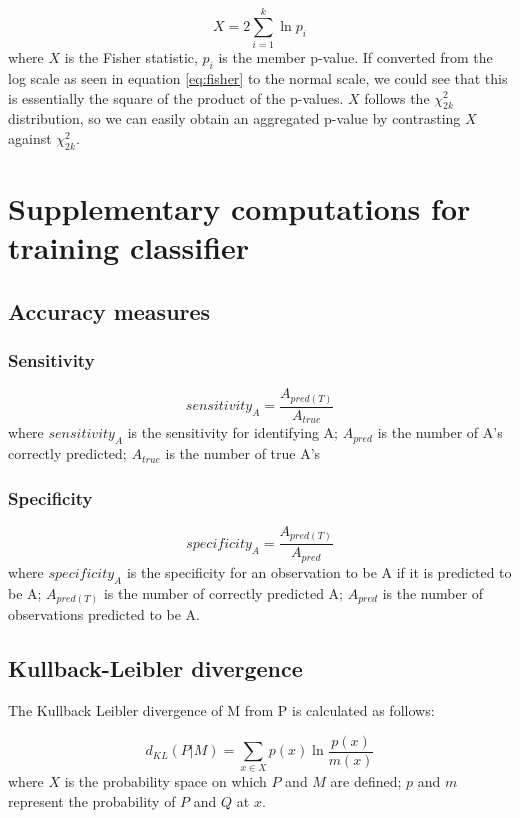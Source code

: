 \begin{equation}
    X = 2 \sum_{i=1}^k \ln{p_i}
    \label{eq:fisher}
\end{equation}
where $X$ is the Fisher statistic, $p_i$ is the member p-value. If converted from the log scale as seen in equation \ref{eq:fisher} to the normal scale, we could see that this is essentially the square of the product of the p-values. $X$ follows the $\chi^2_{2k}$ distribution, so we can easily obtain an aggregated p-value by contrasting $X$ against $\chi^2_{2k}$.

\newpage
\section{Supplementary computations for training classifier}

\subsection{Accuracy measures}

\subsubsection{Sensitivity}
\begin{equation}
    sensitivity_A = \frac{A_{pred(T)}}{A_{true}} 
    \label{eq:sensitivity}
\end{equation}
where $sensitivity_A$ is the sensitivity for identifying A; $A_{pred}$ is the number of A's correctly predicted; $A_{true}$ is the number of true A's

\subsubsection{Specificity}
\begin{equation}
    specificity_A = \frac{A_{pred(T)}}{A_{pred}}
    \label{eq:specificity}
\end{equation}
where $specificity_A$ is the specificity for an observation to be A if it is predicted to be A; $A_{pred(T)}$ is the number of correctly predicted A; $A_{pred}$ is the number of observations predicted to be A.

\subsection{Kullback-Leibler divergence}
The Kullback Leibler divergence of M from P is calculated as follows:

\begin{equation}
    d_{KL}(P|M) = \sum_{x \in X} p(x) \ln{\frac{p(x)}{m(x)}}
    \label{eq:kl}
\end{equation}
where $X$ is the probability space on which $P$ and $M$ are defined; $p$ and $m$ represent the probability of $P$ and $Q$ at $x$.

